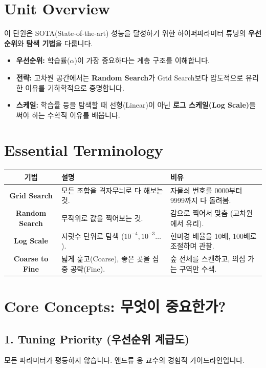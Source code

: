 \documentclass[11pt,a4paper]{book}
\theoremstyle{definition}
\begin{document}
\section{Unit Overview}
\begin{summarybox}[title={핵심 목표}]
이 단원은 SOTA(State-of-the-art) 성능을 달성하기 위한 하이퍼파라미터 튜닝의 \textbf{우선순위}와 \textbf{탐색 기법}을 다룹니다.
\begin{itemize}
    \item \textbf{우선순위:} 학습률($\alpha$)이 가장 중요하다는 계층 구조를 이해합니다.
    \item \textbf{전략:} 고차원 공간에서는 \textbf{Random Search}가 Grid Search보다 압도적으로 유리한 이유를 기하학적으로 증명합니다.
    \item \textbf{스케일:} 학습률 등을 탐색할 때 선형(Linear)이 아닌 \textbf{로그 스케일(Log Scale)}을 써야 하는 수학적 이유를 배웁니다.
\end{itemize}
\end{summarybox}

\section{Essential Terminology}
\begin{center}
\begin{tabular}{|c|l|l|}
\hline
\textbf{기법} & \textbf{설명} & \textbf{비유} \\ \hline
\textbf{Grid Search} & 모든 조합을 격자무늬로 다 해보는 것. & 자물쇠 번호를 0000부터 9999까지 다 돌려봄. \\ \hline
\textbf{Random Search} & 무작위로 값을 찍어보는 것. & 감으로 찍어서 맞춤 (고차원에서 유리). \\ \hline
\textbf{Log Scale} & 자릿수 단위로 탐색 ($10^{-4}, 10^{-3} \dots$). & 현미경 배율을 10배, 100배로 조절하며 관찰. \\ \hline
\textbf{Coarse to Fine} & 넓게 훑고(Coarse), 좋은 곳을 집중 공략(Fine). & 숲 전체를 스캔하고, 의심 가는 구역만 수색. \\ \hline
\end{tabular}
\end{center}

\section{Core Concepts: 무엇이 중요한가?}

\subsection{1. Tuning Priority (우선순위 계급도)}
모든 파라미터가 평등하지 않습니다. 앤드류 응 교수의 경험적 가이드라인입니다.
\end{document}
